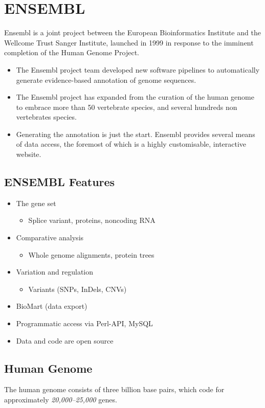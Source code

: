 \documentclass[11pt]{article}
\begin{document}
\section{ENSEMBL}
\label{sec:orgfda85e6}
Ensembl is a joint project between the European Bioinformatics Institute and the
Wellcome Trust Sanger Institute, launched in 1999 in response to the imminent
completion of the Human Genome Project.

\begin{itemize}
\item The Ensembl project team developed new software pipelines to automatically
generate evidence-based annotation of genome sequences.
\item The Ensembl project has expanded from the curation of the human genome to
embrace more than 50 vertebrate species, and several hundreds non vertebrates
species.
\item Generating the annotation is just the start. Ensembl provides several means of
data access, the foremost of which is a highly customisable, interactive
website.
\end{itemize}

\subsection{ENSEMBL Features}
\label{sec:orga09e66d}
\begin{itemize}
\item The gene set
\begin{itemize}
\item Splice variant, proteins, noncoding RNA
\end{itemize}
\item Comparative analysis
\begin{itemize}
\item Whole genome alignments, protein trees
\end{itemize}
\item Variation and regulation
\begin{itemize}
\item Variants (SNPs, InDels, CNVs)
\end{itemize}
\item BioMart (data export)
\item Programmatic access via Perl-API, MySQL
\item Data and code are open source
\end{itemize}


\subsection{Human Genome}
\label{sec:orgb1ff8e2}
The human genome consists of three billion base pairs, which code for approximately \emph{20,000–25,000} genes.
\end{document}
